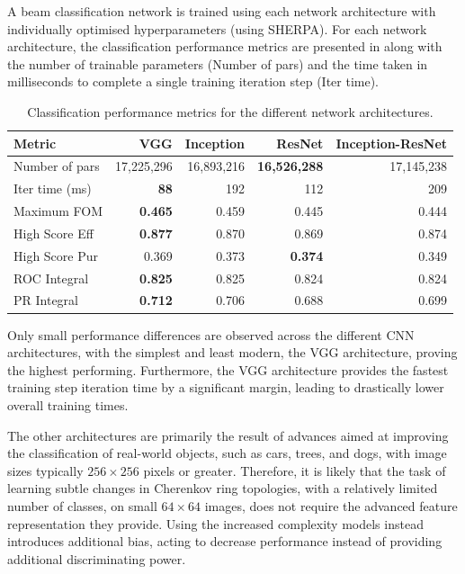 A beam classification network is trained using each network architecture with individually
optimised hyperparameters (using SHERPA). For each network architecture, the classification
performance metrics are presented in  along with the number of trainable
parameters (Number of pars) and the time taken in milliseconds to complete a single training
iteration step (Iter time).

\begin{table} %
    \begin{tabular}{lrrrr}
        Metric         & VGG            & Inception  & ResNet              & Inception-ResNet \\
        \midrule
        Number of pars & 17,225,296     & 16,893,216 & \textbf{16,526,288} & 17,145,238       \\
        Iter time (ms) & \textbf{88}    & 192        & 112                 & 209              \\
        Maximum FOM    & \textbf{0.465} & 0.459      & 0.445               & 0.444            \\
        High Score Eff & \textbf{0.877} & 0.870      & 0.869               & 0.874            \\
        High Score Pur & 0.369          & 0.373      & \textbf{0.374}      & 0.349            \\
        ROC Integral   & \textbf{0.825} & 0.825      & 0.824               & 0.824            \\
        PR Integral    & \textbf{0.712} & 0.706      & 0.688               & 0.699            \\
    \end{tabular}
    \caption[Classification performance metrics for different network architectures]
    {Classification performance metrics for the different network architectures.}
    \label{tab:arch}
\end{table}

Only small performance differences are observed across the different CNN architectures, with the
simplest and least modern, the VGG architecture, proving the highest performing. Furthermore, the
VGG architecture provides the fastest training step iteration time by a significant margin,
leading to drastically lower overall training times.

The other architectures are primarily the result of advances aimed at improving the classification
of real-world objects, such as cars, trees, and dogs, with image sizes typically $256\times256$
pixels or greater. Therefore, it is likely that the task of learning subtle changes in Cherenkov
ring topologies, with a relatively limited number of classes, on small $64\times64$ images, does
not require the advanced feature representation they provide. Using the increased complexity
models instead introduces additional bias, acting to decrease performance instead of providing
additional discriminating power.